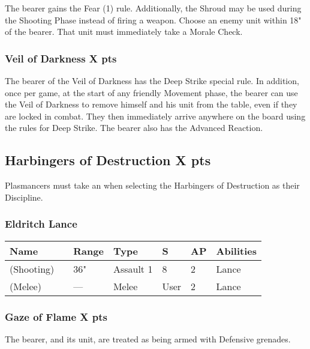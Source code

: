 The bearer gains the Fear (1) rule. Additionally, the Shroud may be used during the Shooting Phase instead of firing a weapon. Choose an enemy unit within 18" of the bearer. That unit must immediately take a Morale Check.

\subsubsection[Veil of Darkness ]{Veil of Darkness  \hrulefill X pts}

The bearer of the Veil of Darkness has the Deep Strike special rule. In addition, once per game, at the start of any friendly Movement phase, the bearer can use the Veil of Darkness to remove himself and his unit from the table, even if they are locked in combat. They then immediately arrive anywhere on the board using the rules for Deep Strike. The bearer also has the  Advanced Reaction.



\subsection[Harbingers of Destruction ]{Harbingers of Destruction  \hrulefill X pts}

Plasmancers must take an  when selecting the Harbingers of Destruction as their Discipline.

\subsubsection{Eldritch Lance}
\label{Eldritch Lance}
\noindent
\begin{tabular}{||m{130pt} m{10pt} m{31pt} m{55pt} m{12pt} m{12pt} m{210pt}||}
	\hline
	Name & & Range & Type & S & AP & Abilities \\
	\hline
	\quickref{Eldritch Lance} (Shooting) & & 36" & Assault 1 & 8 & 2 & Lance \\
	\quickref{Eldritch Lance} (Melee) & & — & Melee & User & 2 & Lance \\
	\hline
\end{tabular}

\subsubsection[Gaze of Flame ]{Gaze of Flame  \hrulefill X pts}

The bearer, and its unit, are treated as being armed with Defensive grenades.

